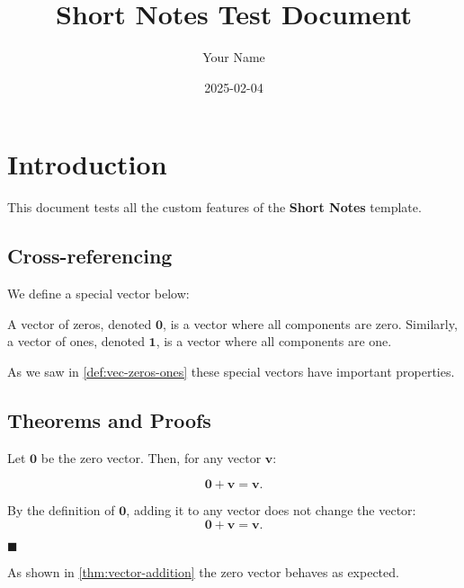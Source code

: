 \documentclass[
  14pt,
  a4paper,
]{extarticle}
\title{Short Notes Test Document}
\author{Your Name}
\date{2025-02-04}
\renewenvironment{proof}{%
   \par\noindent{\color{nmuprimaryblue}\addfontfeatures{Weight=700}Proof:}\normalfont}{%
   \hfill$\blacksquare$\par}
\begin{document}
\maketitle

\section{Introduction}\label{introduction}

This document tests all the custom features of the \textbf{Short Notes}
template.

\subsection{Cross-referencing}\label{cross-referencing}

We define a special vector below:

\begin{definition}\label{def:vec-zeros-ones}

A vector of zeros, denoted \(\mathbf{0}\), is a vector where all
components are zero. Similarly, a vector of ones, denoted
\(\mathbf{1}\), is a vector where all components are one.

\end{definition}

As we saw in \autoref{def:vec-zeros-ones} these special vectors have
important properties.

\subsection{Theorems and Proofs}\label{theorems-and-proofs}

\begin{theorem}\label{thm:vector-addition}

Let \(\mathbf{0}\) be the zero vector. Then, for any vector
\(\mathbf{v}\):

\[
\mathbf{0} + \mathbf{v} = \mathbf{v}.
\]

\end{theorem}

\begin{proof}

By the definition of \(\mathbf{0}\), adding it to any vector does not
change the vector: \[
\mathbf{0} + \mathbf{v} = \mathbf{v}.
\]

\end{proof}

As shown in \autoref{thm:vector-addition} the zero vector behaves as
expected.
\end{document}
